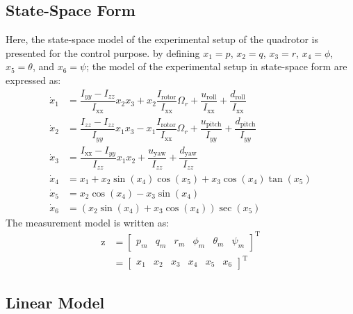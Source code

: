 \documentclass[conference]{IEEEtran}
\begin{document}
\subsection{State-Space Form }
Here, the state-space model of the experimental setup of the quadrotor is presented for the control purpose. by defining $x_1 = p$, $x_2 = q$, $x_3 = r$, $x_4 = \phi$, $x_5 = \theta$, and $x_6 = \psi$; the model of the experimental setup in state-space form are expressed as:
\begin{equation}\label{eq:diffeq}
	\begin{split}
		\dot x_1 &= \dfrac{I_{yy} - I_{zz}}{I_{\text{xx}}} x_2 x_3 + x_2 \dfrac{I_{\text{rotor}}}{I_{\text{xx}}}\Omega_r + \dfrac{u_{\text{roll}}}{I_{\text{xx}}} + \dfrac{d_{\text{roll}}}{I_{\text{xx}}} \\
		\dot x_2 &= \dfrac{I_{zz} - I_{zz}}{I_{yy}} x_1 x_3 - x_1 \dfrac{I_{\text{rotor}}}{I_{\text{xx}}}\Omega_r + \dfrac{u_{\text{pitch}}}{I_{yy}} + \dfrac{d_{\text{pitch}}}{I_{yy}} \\
		\dot x_3 &= \dfrac{I_{\text{xx}} - I_{yy}}{I_{zz}} x_1 x_2 + \dfrac{u_{\text{yaw}}}{I_{zz}} + \dfrac{d_{\text{yaw}}}{I_{zz}} \\
		\dot x_4 &= x_1 + x_2\sin(x_4)\cos(x_5) + x_3\cos(x_4)\tan(x_5)\\
		\dot x_5 &= x_2\cos(x_4) - x_3\sin(x_4)\\
		\dot x_6 &= (x_2\sin(x_4) + x_3\cos(x_4))\sec(x_5)
	\end{split}
\end{equation}
The measurement model is written as:
\begin{equation}
	\begin{split}
		\boldsymbol{\mathrm{z}} &= \begin{bmatrix}
			p_m & q_m & r_m & \phi_m & \theta_m & \psi_m
		\end{bmatrix}^\mathrm{T}
		\\
		& = \begin{bmatrix}
			x_1 & x_2 & x_3 & x_4 & x_5 & x_6
		\end{bmatrix}^\mathrm{T}
	\end{split}
\end{equation}

\subsection{Linear Model}
\end{document}
